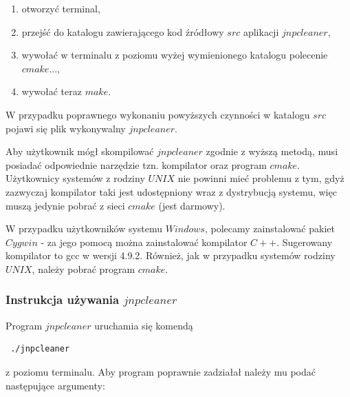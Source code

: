 \documentclass[]{article}
\begin{document}
\begin{enumerate}
	\item otworzyć terminal,
	\item przejść do katalogu zawierającego kod źródłowy $src$ aplikacji $jnpcleaner$,
	\item wywołać w terminalu z poziomu wyżej wymienionego katalogu polecenie $cmake ..$.,
	\item wywołać teraz $make$.
\end{enumerate}

W przypadku poprawnego wykonaniu powyższych czynności w katalogu $src$ pojawi się plik wykonywalny $jnpcleaner$.

Aby użytkownik mógł skompilować $jnpcleaner$ zgodnie z wyższą metodą, musi posiadać odpowiednie narzędzie tzn. kompilator oraz program $cmake$. Użytkownicy systemów z rodziny $UNIX$ nie powinni mieć problemu z tym, gdyż zazwyczaj kompilator taki jest udostępniony wraz z dystrybucją systemu, więc muszą jedynie pobrać z sieci $cmake$ (jest darmowy).

W przypadku użytkowników systemu $Windows$, polecamy zainstalować pakiet $Cygwin$ - za jego pomocą można zainstalować kompilator $C++$. Sugerowany kompilator to gcc w wersji 4.9.2. Również, jak w przypadku systemów rodziny $UNIX$, należy pobrać program $cmake$.

\subsubsection*{Instrukcja używania $jnpcleaner$}

Program $jnpcleaner$ uruchamia się komendą
\begin{verbatim}
 ./jnpcleaner
\end{verbatim}
z poziomu terminalu. Aby program poprawnie zadziałał należy mu podać następujące argumenty:
\end{document}
